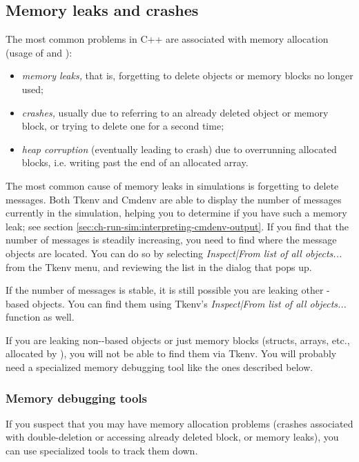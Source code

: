 \subsection{Memory leaks and crashes}

The most common problems in C++ are associated with memory allocation
(usage of  and ):

\begin{itemize}
   \item{\textit{memory leaks,} that is, forgetting to delete objects
     or memory blocks no longer used;}
   \item{\textit{crashes,} usually due to referring to an already deleted
     object or memory block, or trying to delete one for a second time;}
   \item{\textit{heap corruption} (eventually leading to crash) due to
     overrunning allocated blocks, i.e. writing past the end of an allocated
     array.}
\end{itemize}

The most common cause of memory leaks in {\opp} simulations is
forgetting to delete messages. Both Tkenv and Cmdenv are able
to display the number of messages currently in the simulation,
helping you to determine if you have such a memory leak;
see section \ref{sec:ch-run-sim:interpreting-cmdenv-output}.
If you find that the number of messages is steadily increasing,
you need to find where the message objects are located. You can do so
by selecting \textit{Inspect|From list of all objects...} from
the Tkenv menu, and reviewing the list in the dialog that pops up.

If the number of messages is stable, it is still possible
you are leaking other -based objects. You can
find them using Tkenv's \textit{Inspect|From list of all objects...}
function as well.

If you are leaking non--based objects or just
memory blocks (structs, arrays, etc., allocated by ),
you will not be able to find them via Tkenv. You will probably need
a specialized memory debugging tool like the ones described below.

\subsubsection{Memory debugging tools}

If you suspect that you may have memory allocation problems
(crashes associated with double-deletion or accessing already
deleted block, or memory leaks), you can use specialized tools
to track them down.

